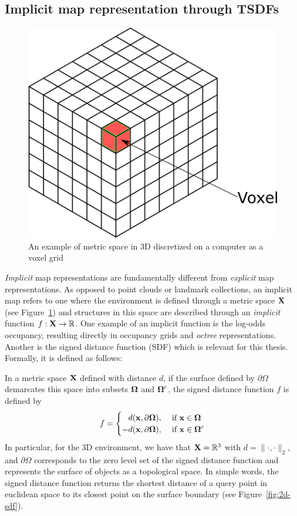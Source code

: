 \subsection{Implicit map representation through TSDFs}

\begin{figure}[htpb]
    \centering
    \includegraphics[width=0.5\linewidth]{figs/metric-space-grid.png}
    \caption{An example of metric space in 3D discretized on a computer as a voxel grid}%
    \label{fig:voxel-grid}
\end{figure}

\emph{Implicit} map representations are fundamentally different from \emph{explicit} map representations. As opposed to point clouds or landmark collections, an implicit map refers to one where the environment is defined through a metric space $\mathbf{X}$ (see Figure~\ref{fig:voxel-grid}) and structures in this space are described through an \emph{implicit} function $f : \mathbf{X} \rightarrow \mathbb{R}$. One example of an implicit function is the log-odds occupancy, resulting directly in occupancy grids \cite{thrunProbabilisticRoboticsIntelligent2005} and \emph{octree} \cite{hornungOctoMapEfficientProbabilistic2013} representations. Another is the signed distance function (SDF) which is relevant for this thesis. Formally, it is defined as follows:

In a metric space $\mathbf{X}$ defined with distance $d$, if the surface defined by $\partial \Omega$ demarcates this space into subsets  $\boldsymbol \Omega$ and  $\boldsymbol \Omega^c$, the signed distance function $f$ is defined by
\begin{align}
   f = \begin{cases}
       \phantom{-}d(\mathbf{x}, \partial \boldsymbol \Omega), &\text{ if } \mathbf{x} \in \boldsymbol \Omega\\
       -d(\mathbf{x}, \partial \boldsymbol \Omega), &\text{ if } \mathbf{x} \in \boldsymbol \Omega^c
   \end{cases}
\end{align}
In particular, for the 3D environment, we have that $\mathbf{X} = \mathbb{R}^3$ with $d = \|\cdot, \cdot \|_2$, and $\partial \Omega$ corresponds to the zero level set of the signed distance function and represents the surface of objects as a topological space. In simple words, the signed distance function returns the shortest distance of a query point in euclidean space to its closest point on the surface boundary (see Figure~\ref{fig:2d-sdf}).

